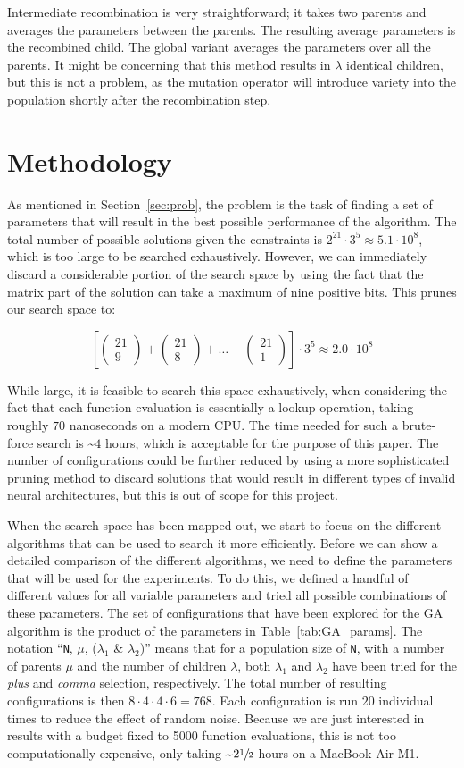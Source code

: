 \documentclass{article}
\newcommand{\tochoose}[1]{\begin{pmatrix} 21 \\ #1 \end{pmatrix}}
\begin{document}
Intermediate recombination is very straightforward; it takes two parents and averages the parameters between the parents.
The resulting average parameters is the recombined child.
The global variant averages the parameters over all the parents.
It might be concerning that this method results in $\lambda$ identical children, but this is not a problem, as the mutation operator will introduce variety into the population shortly after the recombination step.


\section{Methodology}
\label{sec:meth}

As mentioned in Section~\ref{sec:prob}, the problem is the task of finding a set of parameters that will result in the best possible performance of the algorithm.
The total number of possible solutions given the constraints is $2^{21} \cdot 3^5 \approx 5.1 \cdot 10^8$, which is too large to be searched exhaustively.
However, we can immediately discard a considerable portion of the search space by using the fact that the matrix part of the solution can take a maximum of nine positive bits.
This prunes our search space to:

$$\left[ \tochoose{9} + \tochoose{8} + \dots + \tochoose{1}\right]\cdot 3^5 \approx 2.0 \cdot 10^8 $$

While large, it is feasible to search this space exhaustively, when considering the fact that each function evaluation is essentially a lookup operation, taking roughly $70$ nanoseconds on a modern CPU.
The time needed for such a brute-force search is \textasciitilde $4$ hours, which is acceptable for the purpose of this paper.
The number of configurations could be further reduced by using a more sophisticated pruning method to discard solutions that would result in different types of invalid neural architectures, but this is out of scope for this project.

When the search space has been mapped out, we start to focus on the different algorithms that can be used to search it more efficiently.
Before we can show a detailed comparison of the different algorithms, we need to define the parameters that will be used for the experiments.
To do this, we defined a handful of different values for all variable parameters and tried all possible combinations of these parameters.
The set of configurations that have been explored for the GA algorithm is the product of the parameters in Table~\ref{tab:GA_params}.
The notation ``\texttt{N}, $\mu$, ($\lambda_{1}$ \& $\lambda_{2}$)'' means that for a population size of \texttt{N}, with a number of parents $\mu$ and the number of children $\lambda$, both $\lambda_{1}$ and $\lambda_{2}$ have been tried for the \textit{plus} and \textit{comma} selection, respectively.
The total number of resulting configurations is then $8 \cdot 4 \cdot 4 \cdot 6 = 768$.
Each configuration is run $20$ individual times to reduce the effect of random noise.
Because we are just interested in results with a budget fixed to 5000 function evaluations, this is not too computationally expensive, only taking \textasciitilde $2\sfrac{1}{2}$ hours on a MacBook Air M1.
\end{document}
